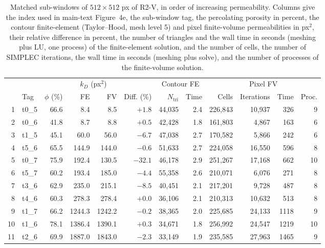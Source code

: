 \begin{table}[htbp]
\centering
\caption{Matched sub-windows of $512\times512$ px of R2-V, in order of increasing permeability. Columns give the index used in main-text Figure~4e, the sub-window tag, the percolating porosity in percent, the contour finite-element (Taylor--Hood, mesh level 5) and pixel finite-volume permeabilities in px$^{2}$, their relative difference in percent, the number of triangles and the wall time in seconds (meshing plus LU, one process) of the finite-element solution, and the number of cells, the number of SIMPLEC iterations, the wall time in seconds (meshing plus solve), and the number of processes of the finite-volume solution.}
\label{tab:subwindows}
\footnotesize
\setlength{\tabcolsep}{4pt}
\begin{tabular}{rlrrrrrrrrrr}
\toprule
 & & & \multicolumn{2}{c}{$k_D$ (px$^{2}$)} & & \multicolumn{2}{c}{Contour FE} & \multicolumn{4}{c}{Pixel FV} \\
\cmidrule(lr){4-5}\cmidrule(lr){7-8}\cmidrule(lr){9-12}
 & Tag & $\phi$ (\%) & FE & FV & Diff. (\%) & $N_{\mathrm{tri}}$ & Time & Cells & Iterations & Time & Proc. \\
\midrule
1 & t0\_5 & 66.6 & 8.4 & 8.5 & $+1.8$ & 44,035 & 2.4 & 226,843 & 10,937 & 326 & 9 \\
2 & t0\_6 & 41.8 & 8.7 & 8.8 & $+0.5$ & 42,428 & 1.8 & 161,803 & 4,867 & 163 & 6 \\
3 & t1\_5 & 45.1 & 60.0 & 56.0 & $-6.7$ & 47,038 & 2.7 & 170,582 & 5,866 & 242 & 6 \\
4 & t5\_6 & 65.5 & 144.9 & 144.0 & $-0.6$ & 51,633 & 2.7 & 224,058 & 16,550 & 596 & 8 \\
5 & t0\_7 & 75.9 & 192.4 & 130.5 & $-32.1$ & 46,178 & 2.9 & 251,267 & 17,168 & 662 & 10 \\
6 & t5\_7 & 60.2 & 193.4 & 185.0 & $-4.4$ & 55,358 & 2.6 & 210,071 & 6,076 & 271 & 8 \\
7 & t3\_6 & 62.9 & 235.0 & 215.1 & $-8.5$ & 40,451 & 2.1 & 217,201 & 9,728 & 487 & 8 \\
8 & t4\_6 & 60.3 & 278.3 & 278.4 & $+0.0$ & 36,106 & 2.1 & 210,313 & 10,632 & 513 & 8 \\
9 & t1\_7 & 66.2 & 1244.3 & 1242.2 & $-0.2$ & 38,365 & 2.0 & 225,685 & 24,133 & 1118 & 9 \\
10 & t1\_6 & 78.1 & 1386.4 & 1390.1 & $+0.3$ & 34,671 & 1.8 & 256,992 & 24,547 & 1219 & 10 \\
11 & t2\_6 & 69.9 & 1887.0 & 1843.0 & $-2.3$ & 33,149 & 1.9 & 235,585 & 27,963 & 1465 & 9 \\
\bottomrule
\end{tabular}
\end{table}
